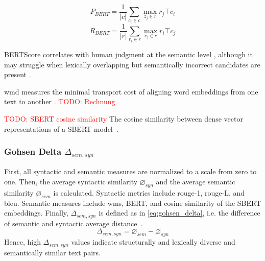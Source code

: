 \begin{equation}
    P_{BERT} = \frac{1}{|c|} \sum_{c_i \in c} \max_{z_j \in r} r_j\top c_i
\label{eq:bert_p}
\end{equation}
\begin{equation}
    R_{BERT} = \frac{1}{|r|} \sum_{r_i \in r} \max_{c_j \in c} r_i\top c_j
\label{eq:bert_r}
\end{equation}



BERTScore correlates with human judgment at the semantic level \citep{kurt_pehlivanoglu_comparative_2024}, although it may struggle when lexically overlapping but semantically incorrect candidates are present \citep{hanna_fine_grained_2021}.

\ac{wmd} measures the minimal transport cost of aligning word embeddings from one text to another \citep{gohsen_captions_2023}. 
\textcolor{red}{TODO: Rechnung}

\textcolor{red}{TODO: SBERT cosine similarity}
The cosine similarity between dense vector representations of a SBERT model~\citep{gohsen_captions_2023}.

\subsubsection{Gohsen Delta $\Delta_{sem,syn}$}
First, all syntactic and semantic measures are normalized to a scale from zero to one.
Then, the average syntactic similarity $\diameter_{syn}$ and the average semantic similarity $\diameter_{sem}$ is calculated.
Syntactic metrics include \ac{rouge}-1, \ac{rouge}-L, and \ac{bleu}.
Semantic measures include \ac{wms}, BERT, and cosine similarity of the SBERT embeddings.
Finally, $\Delta_{sem,syn}$ is defined as in \autoref{eq:gohsen_delta}, i.e. the difference of semantic and syntactic average distance~\citep{gohsen_captions_2023}.
\begin{equation}
    \Delta_{sem,syn}=\diameter_{sem}-\diameter_{syn}
    \label{eq:gohsen_delta}
\end{equation}
Hence, high $\Delta_{sem,syn}$ values indicate structurally and lexically diverse and semantically similar text pairs.
